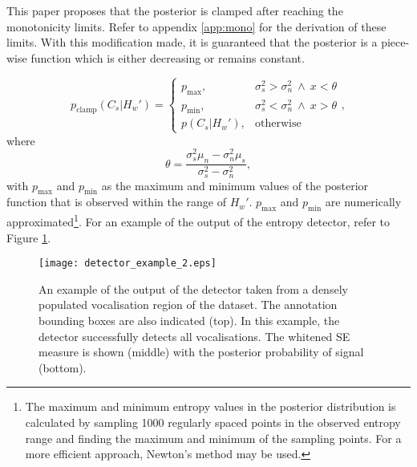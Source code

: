 {This paper proposes that the posterior is clamped after reaching the monotonicity limits. Refer to appendix \ref{app:mono} for the derivation of these limits. With this modification made, it is guaranteed that the posterior is a piece-wise function which is either decreasing or remains constant.

\begin{equation}
p_{\text{clamp}}(C_s | H_w') = 
    \begin{cases}
        p_\text{max},&  \sigma_s^2 > \sigma_n^2 \ \wedge \  x < \theta \\
        p_\text{min},& \sigma_s^2 < \sigma_n^2 \ \wedge \ x > \theta\\
        p(C_s | H_w'),&  \text{otherwise}
    \end{cases},
\end{equation}
where
\begin{equation}
    \theta = \frac{\sigma_s^2\mu_n - \sigma_n^2\mu_s}{\sigma_s^2 - \sigma_n^2},
\end{equation}
with $p_\text{max}$ and $p_\text{min}$ as the maximum and minimum values of the posterior function that is observed within the range of $H_w'$.
$p_\text{max}$ and $p_\text{min}$ are numerically approximated\footnote{The maximum and minimum entropy values in the posterior distribution is calculated by sampling 1000 regularly spaced points in the observed entropy range and finding the maximum and minimum of the sampling points. For a more efficient approach, Newton's method may be used.}. For an example of the output of the entropy detector, refer to Figure \ref{fig:det_example_1}. 

\begin{figure}[]
    \centering
    \texttt{[image: detector\_example\_2.eps]}
    \caption[An example of the output of the detector.]{An example of the output of the detector taken from a densely populated vocalisation region of the dataset. The annotation bounding boxes are also indicated (top). In this example, the detector successfully detects all vocalisations. The whitened SE measure is shown (middle) with the posterior probability of signal (bottom).}
    \label{fig:det_example_1}
\end{figure}

}

